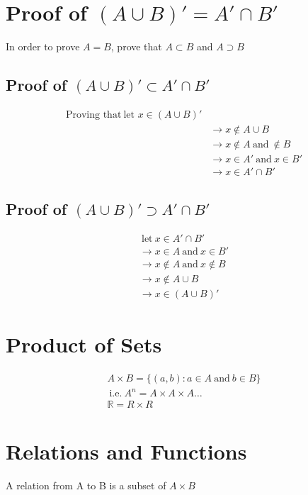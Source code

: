 \documentclass[class=scrartcl, crop=false]{standalone}
\begin{document}
\section{Proof of  $(A \cup B)' = A' \cap B'$}

In order to prove $A=B$, prove that $A\subset B$ and $A\supset B$

\subsection{Proof of $(A \cup B)' \subset A' \cap B'$ } 

\begin{align*}
\text{Proving that} \ \text{let } x \in (A \cup B)' \\
& \rightarrow x \notin A \cup B \\
& \rightarrow x \notin A \ \text{and} \ \notin B \\
& \rightarrow x \in A' \ \text{and} \ x \in B' \\
& \rightarrow x \in A' \cap B'
\end{align*} 


\subsection{Proof of $(A \cup B)' \supset A' \cap B'$ } 
\begin{align*}
\ \text{let} \ x \in A' \cap B' \\
\rightarrow x \in A \ \text{and} \ x \in B' \\
\rightarrow x \notin A \ \text{and} \ x \notin B \\
\rightarrow x \notin A \cup B \\
\rightarrow x \in (A \cup B)'
\end{align*} 

\section{Product of Sets}

\begin{align*}
  A \times B = \{(a,b): a \in A \ \text{and} \ b \in B\} \\
  \ \text{i.e.} \ A^n = A \times A \times A \ldots \\
  \mathbb{R} = R \times R
\end{align*} 

\section{Relations and Functions}
A relation from A to B is a subset of $A \times B$
\end{document}
